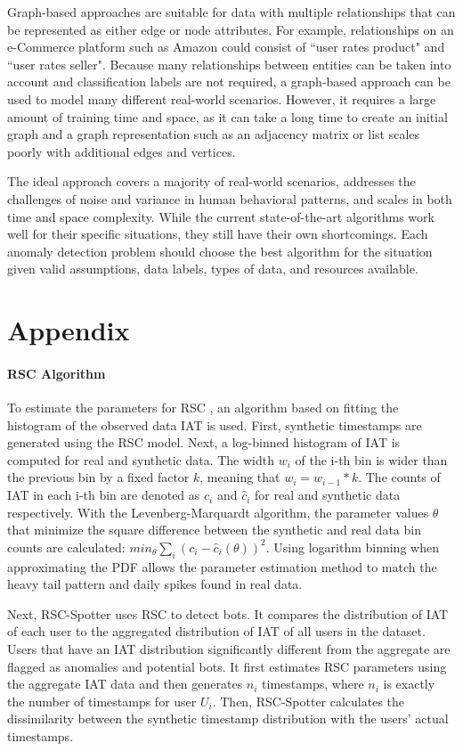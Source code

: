 \documentclass[11pt, oneside]{article}   	%
\begin{document}
\quad Graph-based approaches are suitable for data with multiple relationships that can be represented as either edge or node attributes.
For example, relationships on an e-Commerce platform such as Amazon could consist of ``user rates product" and ``user rates seller".
Because many relationships between entities can be taken into account and classification labels are not required, a graph-based approach can be used to model many different real-world scenarios.
However, it requires a large amount of training time and space, as it can take a long time to create an initial graph and a graph representation such as an adjacency matrix or list scales poorly with additional edges and vertices.

\quad The ideal approach covers a majority of real-world scenarios, addresses the challenges of noise and variance in human behavioral patterns, and scales in both time and space complexity.
While the current state-of-the-art algorithms work well for their specific situations, they still have their own shortcomings. Each anomaly detection problem should choose the best algorithm for the situation given valid assumptions, data labels, types of data, and resources available.

\section{Appendix}
\paragraph*{RSC Algorithm}
\quad

\quad To estimate the parameters for RSC \cite{rsc}, an algorithm based on fitting the histogram of the observed data IAT is used.
First, synthetic timestamps are generated using the RSC model.
Next, a log-binned histogram of IAT is computed for real and synthetic data.
The width $w_i$ of the i-th bin is wider than the previous bin by a fixed factor $k$, meaning that $w_i=w_{i-1}*k$.
The counts of IAT in each i-th bin are denoted as $c_i$ and $\hat{c}_i$ for real and synthetic data respectively.
With the Levenberg-Marquardt algorithm, the parameter values $\theta$ that minimize the square difference between the synthetic and real data bin counts are calculated: $min_{\theta} \sum_i (c_i - \hat{c}_i(\theta))^2$.
Using logarithm binning when approximating the PDF allows the parameter estimation method to match the heavy tail pattern and daily spikes found in real data.

\quad Next, RSC-Spotter uses RSC to detect bots.
It compares the distribution of IAT of each user to the aggregated distribution of IAT of all users in the dataset.
Users that have an IAT distribution significantly different from the aggregate are flagged as anomalies and potential bots.
It first estimates RSC parameters using the aggregate IAT data and then generates $n_i$ timestamps, where $n_i$ is exactly the number of timestamps for user $U_i$.
Then, RSC-Spotter calculates the dissimilarity between the synthetic timestamp distribution with the users' actual timestamps.
\end{document}
